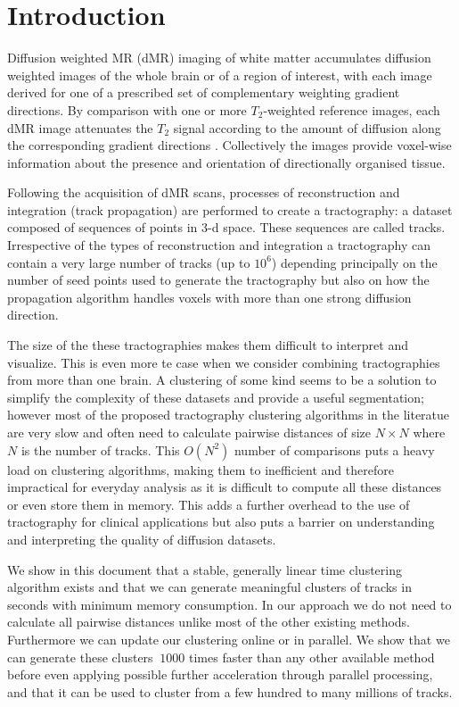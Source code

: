 \documentclass[preprint,authoryear,a4paper,10pt,onecolumn]{elsarticle}
\begin{document}
\section{Introduction}

Diffusion weighted MR (dMR) imaging of white matter accumulates diffusion
weighted images of the whole brain or of a region of interest, with each
image derived for one of a prescribed set of complementary weighting
gradient directions. By comparison with one or more $T_{2}$-weighted
reference images, each dMR image attenuates the $T_{2}$ signal according
to the amount of diffusion along the corresponding gradient directions
\citep{DiffMRIBook}. Collectively the images provide voxel-wise
information about the presence and orientation of directionally
organised tissue.

Following the acquisition of dMR scans, processes of reconstruction and
integration (track propagation) are performed to create a tractography:
a dataset composed of sequences of points in 3-d space. These sequences
are called tracks. Irrespective of the types of reconstruction and
integration a tractography can contain a very large number of tracks (up
to $10^6$) depending principally on the number of seed points used to
generate the tractography but also on how the propagation algorithm
handles voxels with more than one strong diffusion direction.

The size of the these tractographies makes them difficult to interpret
and visualize. This is even more te case when we consider combining
tractographies from more than one brain. A clustering of some kind seems
to be a solution to simplify the complexity of these datasets and
provide a useful segmentation; however most of the proposed tractography
clustering algorithms in the literatue are very slow and often need to
calculate pairwise distances of size $N\times N$ where $N$ is the number
of tracks. This $O(N^2)$ number of comparisons puts a heavy load on
clustering algorithms, making them to inefficient and therefore
impractical for everyday analysis as it is difficult to compute all
these distances or even store them in memory. This adds a further
overhead to the use of tractography for clinical applications but also
puts a barrier on understanding and interpreting the quality of
diffusion datasets.

We show in this document that a stable, generally linear time clustering
algorithm exists and that we can generate meaningful clusters of tracks
in seconds with minimum memory consumption. In our approach we do not
need to calculate all pairwise distances unlike most of the other
existing methods. Furthermore we can update our clustering online or in
parallel. We show that we can generate these clusters $~1000$ times
faster than any other available method before even applying possible
further acceleration through parallel processing, and that it can be
used to cluster from a few hundred to many millions of tracks.
\end{document}
